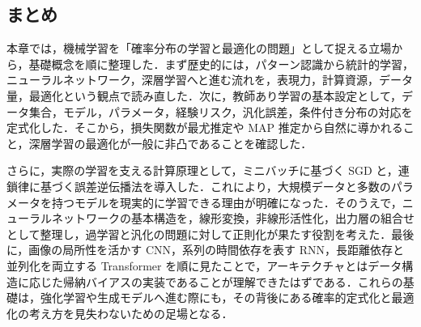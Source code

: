 \subsection*{まとめ}
本章では，機械学習を「確率分布の学習と最適化の問題」として捉える立場から，基礎概念を順に整理した．まず歴史的には，パターン認識から統計的学習，ニューラルネットワーク，深層学習へと進む流れを，表現力，計算資源，データ量，最適化という観点で読み直した．次に，教師あり学習の基本設定として，データ集合，モデル，パラメータ，経験リスク，汎化誤差，条件付き分布の対応を定式化した．そこから，損失関数が最尤推定や MAP 推定から自然に導かれること，深層学習の最適化が一般に非凸であることを確認した．

さらに，実際の学習を支える計算原理として，ミニバッチに基づく SGD と，連鎖律に基づく誤差逆伝播法を導入した．これにより，大規模データと多数のパラメータを持つモデルを現実的に学習できる理由が明確になった．そのうえで，ニューラルネットワークの基本構造を，線形変換，非線形活性化，出力層の組合せとして整理し，過学習と汎化の問題に対して正則化が果たす役割を考えた．最後に，画像の局所性を活かす CNN，系列の時間依存を表す RNN，長距離依存と並列化を両立する Transformer を順に見たことで，アーキテクチャとはデータ構造に応じた帰納バイアスの実装であることが理解できたはずである．これらの基礎は，強化学習や生成モデルへ進む際にも，その背後にある確率的定式化と最適化の考え方を見失わないための足場となる．
